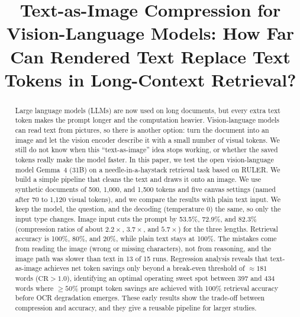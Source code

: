\documentclass[conference]{IEEEtran}
\begin{document}
\title{Text-as-Image Compression for Vision-Language Models: How Far Can Rendered Text Replace Text Tokens in Long-Context Retrieval?}

\author{
\and
{}
\and
{}
}

\maketitle

\begin{abstract}
Large language models (LLMs) are now used on long documents, but every extra text token makes the prompt longer and the computation heavier. Vision-language models can read text from pictures, so there is another option: turn the document into an image and let the vision encoder describe it with a small number of visual tokens. We still do not know when this ``text-as-image'' idea stops working, or whether the saved tokens really make the model faster. In this paper, we test the open vision-language model Gemma~4 (31B) on a needle-in-a-haystack retrieval task based on RULER. We build a simple pipeline that cleans the text and draws it onto an image. We use synthetic documents of 500, 1{,}000, and 1{,}500 tokens and five canvas settings (named after 70 to 1{,}120 visual tokens), and we compare the results with plain text input. We keep the model, the question, and the decoding (temperature $0$) the same, so only the input type changes. Image input cuts the prompt by 53.5\%, 72.9\%, and 82.3\% (compression ratios of about $2.2\times$, $3.7\times$, and $5.7\times$) for the three lengths. Retrieval accuracy is 100\%, 80\%, and 20\%, while plain text stays at 100\%. The mistakes come from reading the image (wrong or missing characters), not from reasoning, and the image path was slower than text in 13 of 15 runs. Regression analysis reveals that text-as-image achieves net token savings only beyond a break-even threshold of $\approx 181$ words ($\mathrm{CR} > 1.0$), identifying an optimal operating sweet spot between 397 and 434 words where $\ge 50\%$ prompt token savings are achieved with 100\% retrieval accuracy before OCR degradation emerges. These early results show the trade-off between compression and accuracy, and they give a reusable pipeline for larger studies.
\end{abstract}
\end{document}
